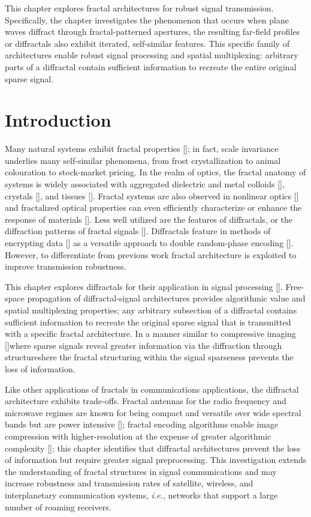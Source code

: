 This chapter explores fractal architectures for robust signal transmission. Specifically, the chapter investigates the phenomenon that occurs when plane waves diffract through fractal-patterned apertures, the resulting far-field profiles or diffractals also exhibit iterated, self-similar features. This specific family of architectures enable robust signal processing and spatial multiplexing: arbitrary parts of a diffractal contain sufficient information to recreate the entire original sparse signal.

\section{Introduction}
Many natural systems exhibit fractal properties [\cite{Mandlebrot}]; in fact, scale invariance underlies many self-similar phenomena, from frost crystallization to animal colouration to stock-market pricing. In the realm of optics, the fractal anatomy of systems is widely associated with aggregated dielectric and metal colloids [\cite{Sorensen}], crystals [\cite{Macke}], and tissues [\cite{Schmitt}]. Fractal systems are also observed in nonlinear optics [\cite{Soljacic, Segev}] and fractalized optical properties can even efficiently characterize or enhance the response of materials [\cite{Stockman, Tsai}]. Less well utilized are the features of diffractals, or the diffraction patterns of fractal signals  [\cite{Berry,Horvath,Hou}]. Diffractals feature in methods of encrypting data [\cite{Barrera}] as a versatile approach to double random-phase encoding [\cite{Unnikrishnan}]. However, to differentiate from previous work fractal architecture is exploited to improve transmission robustness.

This chapter explores diffractals for their application in signal processing [\cite{Verma,Verma2}]. Free-space propagation of diffractal-signal architectures provides algorithmic value and spatial multiplexing properties; any arbitrary subsection of a diffractal contains sufficient information to recreate the original sparse signal that is transmitted with a specific fractal architecture. In a manner similar to compressive imaging [\cite{Kelly07, Howland}]\textemdash where sparse signals reveal greater information via the diffraction through structures\textemdash here the fractal structuring within the signal sparseness prevents the loss of information.

Like other applications of fractals in communications applications, the diffractal architecture exhibits trade-offs. Fractal antennas for the radio frequency and microwave regimes are known for being compact and versatile over wide spectral bands but are power intensive [\cite{Radonic,Puente-Baliarda}]; fractal encoding algorithms enable image compression with higher-resolution at the expense of greater algorithmic complexity [\cite{Jacquin}]; this chapter identifies that diffractal architectures prevent the loss of information but require greater signal preprocessing.  This investigation extends the understanding of fractal structures in signal communications and may increase robustness and transmission rates of satellite, wireless, and interplanetary communication systems, {\it i.e.,} networks that support a large number of roaming receivers.

